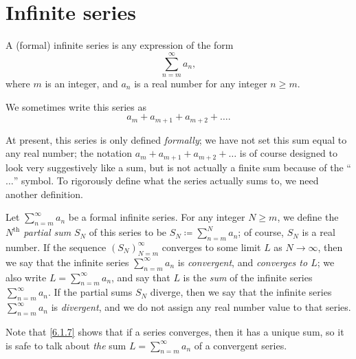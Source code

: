 \section{Infinite series}\label{sec:7.2}

\begin{defn}\label{7.2.1}
  A (formal) infinite series is any expression of the form
  \[
    \sum_{n = m}^\infty a_n,
  \]
  where \(m\) is an integer, and \(a_n\) is a real number for any integer \(n \geq m\).
\end{defn}

\begin{note}
  We sometimes write this series as
  \[
    a_m + a_{m + 1} + a_{m + 2} + \dots.
  \]
\end{note}

\begin{note}
  At present, this series is only defined \emph{formally};
  we have not set this sum equal to any real number;
  the notation \(a_m + a_{m + 1} + a_{m + 2} + \dots\) is of course designed to look very suggestively like a sum, but is not actually a finite sum because of the ``\(\dots\)'' symbol.
  To rigorously define what the series actually sums to, we need another definition.
\end{note}

\begin{defn}\label{7.2.2}
  Let \(\sum_{n = m}^\infty a_n\) be a formal infinite series.
  For any integer \(N \geq m\), we define the \emph{\(N^{\text{th}}\) partial sum} \(S_N\) of this series to be \(S_N \coloneqq \sum_{n = m}^N a_n\);
  of course, \(S_N\) is a real number.
  If the sequence \((S_N)_{N = m}^\infty\) converges to some limit \(L\) as \(N \to \infty\), then we say that the infinite series \(\sum_{n = m}^\infty a_n\) is \emph{convergent}, and \emph{converges to \(L\)};
  we also write \(L = \sum_{n = m}^\infty a_n\), and say that \(L\) is the \emph{sum} of the infinite series \(\sum_{n = m}^\infty a_n\).
  If the partial sums \(S_N\) diverge, then we say that the infinite series \(\sum_{n = m}^\infty a_n\) is \emph{divergent}, and we do not assign any real number value to that series.
\end{defn}

\begin{rmk}\label{7.2.3}
  Note that \cref{6.1.7} shows that if a series converges, then it has a unique sum, so it is safe to talk about \emph{the} sum \(L = \sum_{n = m}^\infty a_n\) of a convergent series.
\end{rmk}

